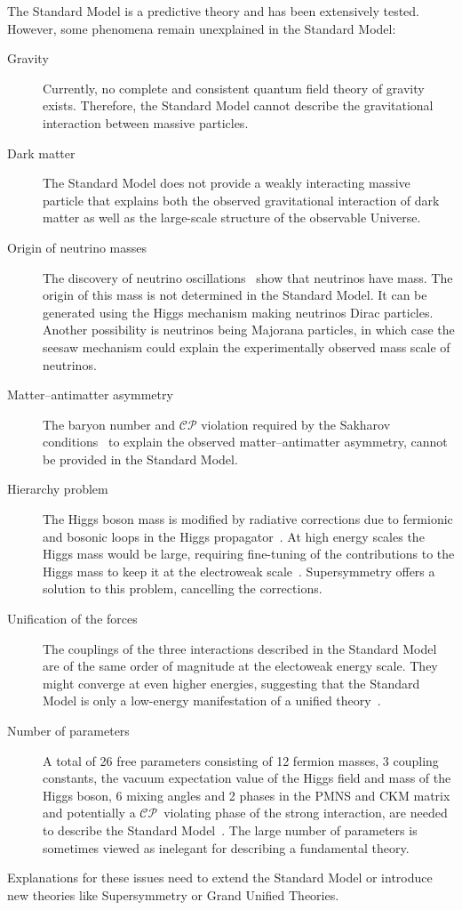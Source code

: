 The Standard Model is a predictive theory and has been extensively tested.
However, some phenomena remain unexplained in the Standard Model:
\begin{description}
\item[Gravity] Currently, no complete and consistent quantum field theory of
  gravity exists. Therefore, the Standard Model cannot describe the
  gravitational interaction between massive particles.

\item[Dark matter] The Standard Model does not provide a weakly interacting
  massive particle that explains both the observed gravitational interaction of
  dark matter as well as the large-scale structure of the observable Universe.

\item[Origin of neutrino masses] The discovery of neutrino
  oscillations~\cite{superk_neutrino, sno_neutrino_1, sno_neutrino_2} show that
  neutrinos have mass. The origin of this mass is not determined in the Standard
  Model. It can be generated using the Higgs mechanism making neutrinos Dirac
  particles. Another possibility is neutrinos being Majorana particles, in which
  case the seesaw mechanism could explain the experimentally observed mass scale
  of neutrinos.

\item[Matter--antimatter asymmetry] The baryon number and $\mathcal{CP}$
  violation required by the Sakharov conditions~\cite{sakharov} to explain the
  observed matter--antimatter asymmetry, cannot be provided in the Standard
  Model.

\item[Hierarchy problem] The Higgs boson mass is modified by radiative
  corrections due to fermionic and bosonic loops in the Higgs
  propagator~\cite{bettini}. At high energy scales the Higgs mass would be
  large, requiring fine-tuning of the contributions to the Higgs mass to keep it
  at the electroweak scale~\cite{thomson}. Supersymmetry offers a solution to
  this problem, cancelling the corrections.

\item[Unification of the forces] The couplings of the three interactions
  described in the Standard Model are of the same order of magnitude at the
  electoweak energy scale. They might converge at even higher energies,
  suggesting that the Standard Model is only a low-energy manifestation of a
  unified theory~\cite{thomson}.

\item[Number of parameters] A total of 26 free parameters consisting of 12
  fermion masses, 3 coupling constants, the vacuum expectation value of the
  Higgs field and mass of the Higgs boson, 6 mixing angles and 2 phases in the
  PMNS and CKM matrix and potentially a $\mathcal{CP}$~violating phase of the
  strong interaction, are needed to describe the Standard Model~\cite{thomson}.
  The large number of parameters is sometimes viewed as inelegant for describing
  a fundamental theory.
\end{description}
Explanations for these issues need to extend the Standard Model or introduce new
theories like Supersymmetry or Grand Unified Theories.

